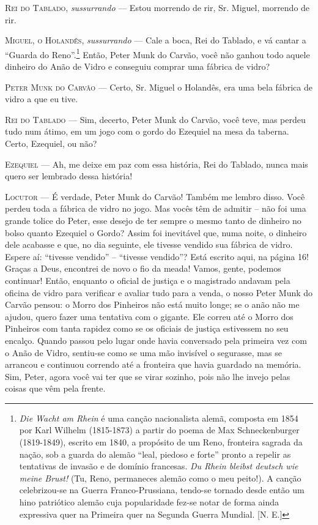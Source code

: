 \textsc{Rei do Tablado}, \emph{sussurrando} --- Estou morrendo de rir, Sr. Miguel,
morrendo de rir.

\textsc{Miguel, o Holandês}, \emph{sussurrando} --- Cale a boca, Rei do Tablado, e
vá cantar a ``Guarda do Reno''.\footnote{\emph{Die Wacht am Rhein} é uma
  canção nacionalista alemã, composta em 1854 por Karl Wilhelm
  (1815-1873) a partir do poema de Max Schneckenburger (1819-1849),
  escrito em 1840, a propósito de um Reno, fronteira sagrada da nação,
  sob a guarda do alemão ``leal, piedoso e forte'' pronto a repelir as
  tentativas de invasão e de domínio francesas. \emph{Du Rhein bleibst
  deutsch wie meine Brust!} (Tu, Reno, permaneces alemão como o meu
  peito!). A canção celebrizou-se na Guerra Franco-Prussiana, tendo-se
  tornado desde então um hino patriótico alemão cuja popularidade fez-se
  notar de forma ainda expressiva quer na Primeira quer na Segunda
  Guerra Mundial. [N. E.]} Então, Peter Munk do Carvão, você não
ganhou todo aquele dinheiro do Anão de Vidro e conseguiu comprar uma
fábrica de vidro?

\textsc{Peter Munk do Carvão} --- Certo, Sr. Miguel o Holandês, era uma bela
fábrica de vidro a que eu tive.

\textsc{Rei do Tablado} --- Sim, decerto, Peter Munk do Carvão, você teve, mas
perdeu tudo num átimo, em um jogo com o gordo do Ezequiel na mesa da
taberna. Certo, Ezequiel, ou não?

\textsc{Ezequiel} --- Ah, me deixe em paz com essa história, Rei do Tablado, nunca
mais quero ser lembrado dessa história!

\textsc{Locutor} --- É verdade, Peter Munk do Carvão! Também me lembro disso. Você
perdeu toda a fábrica de vidro no jogo. Mas vocês têm de admitir -- não
foi uma grande tolice do Peter, esse desejo de ter sempre o mesmo tanto
de dinheiro no bolso quanto Ezequiel o Gordo? Assim foi inevitável que,
numa noite, o dinheiro dele acabasse e que, no dia seguinte, ele tivesse
vendido sua fábrica de vidro. Espere aí: ``tivesse vendido'' --
``tivesse vendido''? Está escrito aqui, na página 16! Graças a Deus,
encontrei de novo o fio da meada! Vamos, gente, podemos continuar!
Então, enquanto o oficial de justiça e o magistrado andavam pela oficina
de vidro para verificar e avaliar tudo para a venda, o nosso Peter Munk
do Carvão pensou: o Morro dos Pinheiros não está muito longe; se o anão
não me ajudou, quero fazer uma tentativa com o gigante. Ele correu até o
Morro dos Pinheiros com tanta rapidez como se os oficiais de justiça
estivessem no seu encalço. Quando passou pelo lugar onde havia
conversado pela primeira vez com o Anão de Vidro, sentiu-se como se uma
mão invisível o segurasse, mas se arrancou e continuou correndo até a
fronteira que havia guardado na memória. Sim, Peter, agora você vai ter
que se virar sozinho, pois não lhe invejo pelas coisas que vêm pela
frente.

